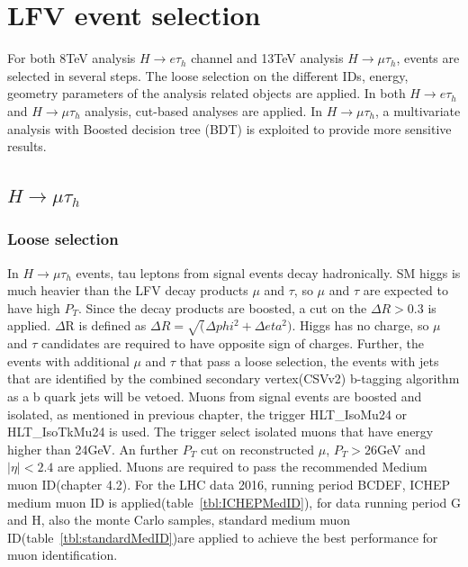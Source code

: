 %
%

\chapter{LFV event selection}
For both 8TeV analysis $H\rightarrow e\tau_h$ channel and 13TeV analysis  $H\rightarrow\mu\tau_h$, events are selected in several steps. The loose selection on the different IDs, energy, geometry parameters of the analysis related objects are applied. In both  $H\rightarrow e\tau_h$ and $H\rightarrow\mu\tau_h$ analysis, cut-based analyses are applied. In $H\rightarrow\mu\tau_h$, a multivariate analysis with Boosted decision tree (BDT) is exploited to provide more sensitive results. 



\section{\texorpdfstring{$H\rightarrow\mu\tau_h$}{Lg}}
\subsection{Loose selection}
In $H\rightarrow\mu\tau_h$ events, tau leptons from signal events decay hadronically. SM higgs is much heavier than the LFV decay products $\mu$ and $\tau$, so $\mu$ and $\tau$ are expected to have high $P_{T}$. Since the decay products are boosted, a cut on the $\Delta R>0.3$ is applied. $\Delta$R is defined as $\Delta R=\sqrt(\Delta phi^{2}+\Delta eta^{2})$. Higgs has no charge, so $\mu$ and $\tau$ candidates are required to have opposite sign of charges. Further, the events with additional $\mu$ and $\tau$ that pass a loose selection, the events with jets that are identified by the combined secondary vertex(CSVv2) b-tagging algorithm \cite{btag_ago} as a b quark jets will be vetoed. Muons from signal events are boosted and isolated, as mentioned in previous chapter, the trigger HLT\_IsoMu24 or HLT\_IsoTkMu24 is used. The trigger select isolated muons that have energy higher than 24GeV. An further $P_{T}$ cut on reconstructed $\mu$,  $P_{T}>26$GeV and $|\eta|<2.4$ are applied. Muons are required to pass the recommended Medium muon ID(chapter 4.2). For the LHC data 2016, running period BCDEF, ICHEP medium muon ID is applied(table~\ref{tbl:ICHEPMedID}), for data running period G and H, also the monte Carlo samples, standard medium muon ID(table~\ref{tbl:standardMedID})are applied to achieve the best performance for muon identification.

